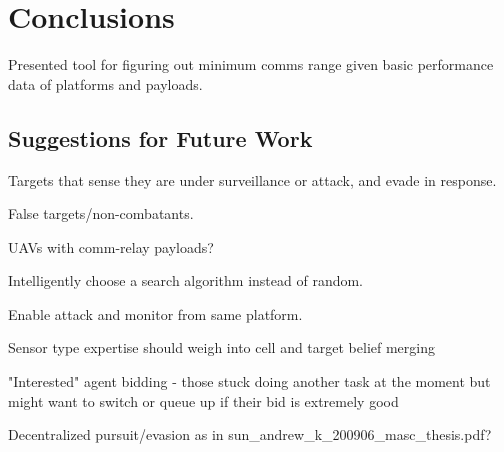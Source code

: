 \chapter{Conclusions}
Presented tool for figuring out minimum comms range given basic performance data of platforms and payloads.

\section{Suggestions for Future Work}
Targets that sense they are under surveillance or attack, and evade in response.

False targets/non-combatants.

UAVs with comm-relay payloads?

Intelligently choose a search algorithm instead of random.


Enable attack and monitor from same platform.

Sensor type expertise should weigh into cell and target belief merging


"Interested" agent bidding - those stuck doing another task at the moment but might want to switch or queue up if their bid is extremely good


Decentralized pursuit/evasion as in sun\_andrew\_k\_200906\_masc\_thesis.pdf?
